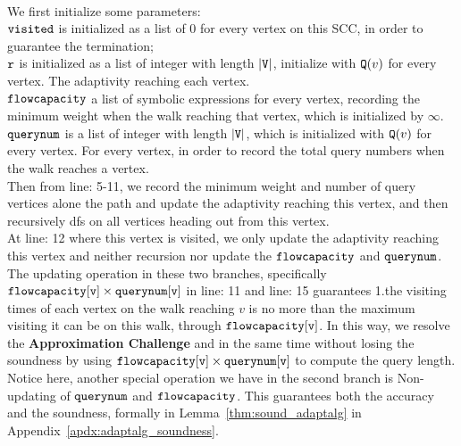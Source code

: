 \\
We first initialize some parameters:
\\
$\mathtt{visited}$ is initialized as a list of $0$ for every vertex on this SCC, in order to guarantee the termination;
\\ 
$\mathtt{r}$ is initialized  as a list of integer with length $|\mathtt{V}|$, initialize with $\mathtt{Q}(v)$ for every vertex. The adaptivity reaching each vertex.
\\ 
$\mathtt{flowcapacity}$ a list of symbolic expressions for every vertex, recording the minimum weight when the walk reaching that vertex, which  is initialized by $\infty$.
\\ 
$\mathtt{querynum}$ is a list of integer with length $|\mathtt{V}|$, which is initialized with $\mathtt{Q}(v)$ for every vertex. 
For every vertex, 
in order to record the total query numbers when the walk reaches a vertex.
\\
Then from line: 5-11, we record the minimum weight and number of query vertices alone the path and update the adaptivity reaching 
this vertex, and then recursively dfs on all vertices heading out from this vertex.
\\
At line: 12 where this vertex is visited, 
we only update the adaptivity reaching this vertex and neither recursion nor update the $\mathtt{flowcapacity}$  and 
$\mathtt{querynum}$.
\\
The updating operation in these two branches, 
specifically $\mathtt{flowcapacity[v] \times querynum[v]}$ in line: 11 and line: 15 
guarantees 
1.the visiting times of each vertex on the walk reaching $v$ is no more than 
the maximum visiting it can be on this walk, through $\mathtt{flowcapacity[v]}$. 
In this way, we resolve the \textbf{Approximation Challenge}  and in the same time without losing the soundness 
by using $\mathtt{flowcapacity[v] \times querynum[v]}$ to compute the query length. 
%
\\
Notice here, another special operation we have in the second branch is Non-updating of
$\mathtt{querynum}$ and $\mathtt{flowcapacity}$.
This guarantees both the accuracy and the soundness, formally in Lemma~\ref{thm:sound_adaptalg} in Appendix~\ref{apdx:adaptalg_soundness}.

